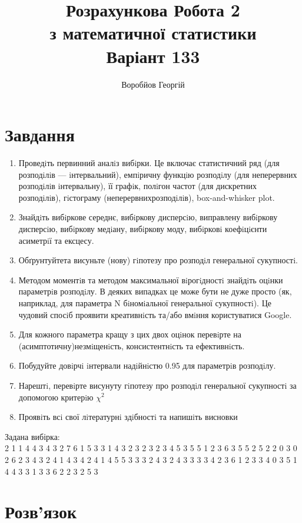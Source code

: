 \documentclass{article}
\title{Розрахункова Робота 2 \\
        з математичної статистики\\ 
        Варіант 133}
\author{Воробйов Георгій}
\begin{document}
\maketitle

\tableofcontents

\section{Завдання}
\begin{enumerate}
    \item Проведiть первинний аналiз вибiрки. Це включає статистичний ряд (для розподiлiв —
        iнтервальний), емпiричну функцiю розподiлу (для неперервних розподiлiв iнтервальну), її
        графiк, полiгон частот (для дискретних розподiлiв), гiстограму (неперервнихрозподiлiв), box-and-whisker 
        plot.
    \item Знайдiть вибiркове середнє, вибiркову дисперсiю, виправлену вибiркову дисперсiю, вибiркову
        медiану, вибiркову моду, вибiрковi коефiцiєнти асиметрiї та ексцесу.
    \item Обґрунтуйтета висуньте (нову) гiпотезу про розподiл генеральної сукупностi. 
    \item Методом моментiв та методом максимальної вiрогiдностi знайдiть оцiнки параметрiв
        розподiлу. В деяких випадках це може бути не дуже просто (як, наприклад, для
        параметра N бiномiальної генеральної сукупностi). Це чудовий спосiб проявити креативнiсть
        та/або вмiння користуватися Google.
    \item Для кожного параметра кращу з цих двох оцiнок перевiрте на (асимптотичну)незмiщенiсть, консистентнiсть 
        та ефективнiсть.
    \item Побудуйте довiрчi iнтервали надiйнiстю 0.95 для параметрiв розподiлу.
    \item Нарештi, перевiрте висунуту гiпотезу про розподiл генеральної сукупностi за
        допомогою критерiю $\chi^2$
    \item Проявiть всi свої лiтературнi здiбностi та напишiть висновки
\end{enumerate}
Задана вибірка: \\ 
2  1  1  4  4  3  4  3  2  7  6  1  5  3  3  1  4  3  2  3  2  3  2  3  4 5  3  5  5  1  2  3  6  3
5  5  2  5  2  2  0  3  0  2  6  2  3  4  3  2 4  1  4  3  4  2  4  1  4  5  5  3  3  3  2  4  3  2
4  3  3  3  3  4  2 3  6  1  2  3  3  4  0  3  5  1  4  4  3  3  1  3  3  6  2  2  3  2  5  3 
\section{Розв'язок}
\end{document}
